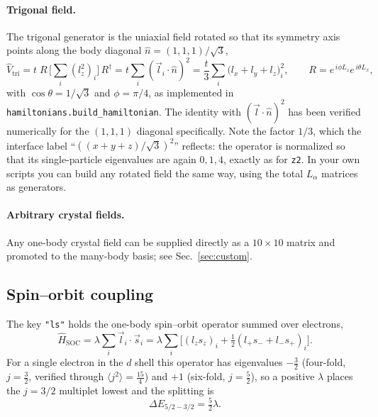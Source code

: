 \documentclass[11pt,a4paper]{article}
\newcommand{\op}[1]{\texttt{#1}}
\begin{document}
\paragraph{Trigonal field.}
The trigonal generator is the uniaxial field rotated so that its symmetry axis
points along the body diagonal $\hat n=(1,1,1)/\sqrt3$,
\begin{equation}
  \hat V_{\mathrm{tri}} = t\; R\,\Big[\textstyle\sum_i (l_z^2)_i\Big]\,R^{\dagger}
  = t \sum_i (\vec l_i\cdot\hat n)^2
  = \frac{t}{3}\sum_i \big(l_x+l_y+l_z\big)^2_i ,
  \qquad
  R=e^{\,i\phi L_z}e^{\,i\theta L_x},
\end{equation}
with $\cos\theta=1/\sqrt3$ and $\phi=\pi/4$, as implemented in
\op{hamiltonians.build\_hamiltonian}.  The identity with $(\vec l\cdot\hat n)^2$
has been verified numerically for the $(1,1,1)$ diagonal specifically.  Note the
factor $1/3$, which the interface label ``$((x+y+z)/\sqrt3)^2$'' reflects: the
operator is normalized so that its single-particle eigenvalues are again
$0,1,4$, exactly as for \op{z2}.  In your own scripts you can build any rotated
field the same way, using the total $L_\alpha$ matrices as generators.

\paragraph{Arbitrary crystal fields.}
Any one-body crystal field can be supplied directly as a $10\times 10$ matrix
and promoted to the many-body basis; see Sec.~\ref{sec:custom}.

\subsection{Spin--orbit coupling}
\label{sec:soc}

The key \op{"ls"} holds the one-body spin--orbit operator summed over electrons,
\begin{equation}
  \hat H_{\mathrm{SOC}} = \lambda \sum_i \vec{l}_i\cdot\vec{s}_i
  = \lambda \sum_i \Big[ (l_z s_z)_i + \tfrac{1}{2}(l_+ s_- + l_- s_+)_i \Big].
\end{equation}
For a single electron in the $d$ shell this operator has eigenvalues
$-\tfrac{3}{2}$ (four-fold, $j=\tfrac{3}{2}$, verified through
$\langle j^2\rangle = \tfrac{15}{4}$) and $+1$ (six-fold, $j=\tfrac{5}{2}$),
so a positive $\lambda$ places the $j=3/2$ multiplet lowest and the splitting is
\begin{equation}
  \Delta E_{5/2-3/2} = \tfrac{5}{2}\lambda .
\end{equation}
\end{document}
